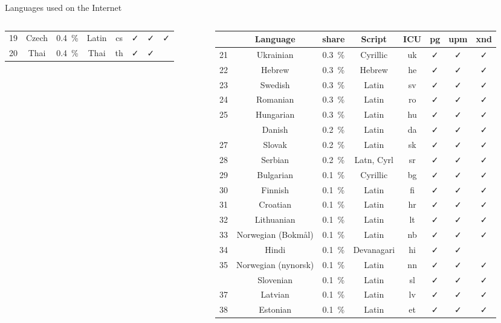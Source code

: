 \documentclass[aspectratio=169,10pt]{beamer}
\newcommand{\colGn}{\color{teal}}
\newcommand{\colBl}{\color{blue}}
\begin{document}
\begin{frame}{Languages used on the Internet}
\begin{columns}
\begin{column}{69mm}
\begin{center}
\begin{tabular}{cc@{~}c@{~}c|c@{~~}c@{~~}c@{~~}c}
19 & Czech & 0.4~\%       &   Latin &    cs    & ✓ & ✓ & ✓  \\
20 & Thai & 0.4~\%        &   {\colBl Thai   } &   th    & ✓ & ✓ &     \\\hline
\end{tabular}
\end{center}
\end{column}
\begin{column}{83mm}
\begin{center}
\scriptsize
\begin{tabular}{cc@{~}c@{~}c|c@{~~}c@{~~}c@{~~}c}
  & Language & share & Script & ICU & pg & upm & xnd\\\hline\hline
21 & Ukrainian & 0.3~\%   &   Cyrillic & uk    & ✓ & ✓ & ✓  \\
22 & Hebrew & 0.3~\%      &   {\colGn Hebrew } &   he    & ✓ & ✓ & ✓  \\
23 & Swedish & 0.3~\%     &   Latin &    sv    & ✓ & ✓ & ✓  \\
24 & Romanian & 0.3~\%    &   Latin &    ro    & ✓ & ✓ & ✓  \\
25 & Hungarian & 0.3~\%   &   Latin &    hu    & ✓ & ✓ & ✓  \\\hdashline
26 & Danish & 0.2~\%      &   Latin &    da    & ✓ & ✓ & ✓  \\
27 & Slovak & 0.2~\%      &   Latin &    sk    & ✓ & ✓ & ✓  \\
28 & Serbian & 0.2~\%     &   Latn, Cyrl & sr  & ✓ & ✓ & ✓  \\ %
29 & Bulgarian & 0.1~\%   &   Cyrillic & bg    & ✓ & ✓ & ✓  \\
30 & Finnish & 0.1~\%     &   Latin &    fi    & ✓ & ✓ & ✓  \\\hline
31 & Croatian & 0.1~\%    &   Latin &    hr    & ✓ & ✓ & ✓  \\
32 & Lithuanian & 0.1~\%  &   Latin &    lt    & ✓ & ✓ & ✓  \\
33 & Norwegian (Bokmål)   & 0.1~\% &   Latin &    nb & ✓ & ✓ & ✓ \\
34 & Hindi & 0.1~\%       &   {\colBl Devanagari} & hi  & ✓ & ✓ &    \\
35 & Norwegian (nynorsk)  & 0.1~\% &   Latin &    nn & ✓ & ✓ & ✓ \\\hdashline
36 & Slovenian & 0.1~\%   &   Latin &    sl    & ✓ & ✓ & ✓  \\ %
37 & Latvian & 0.1~\%     &   Latin &    lv    & ✓ & ✓ & ✓  \\ %
38 & Estonian & 0.1~\%    &   Latin &    et    & ✓ & ✓ & ✓  \\%

\end{tabular}
\end{center}
\end{column}
\end{columns}
\end{frame}
\end{document}
